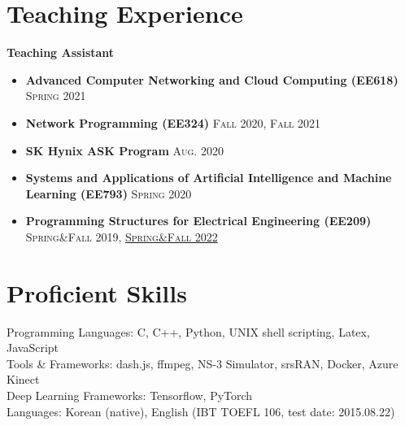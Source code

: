 \documentclass[margin,line,letter]{cv}
\begin{document}
\begin{resume}
\section{\sc Teaching Experience}
\textbf{Teaching Assistant}
\begin{itemize}[leftmargin=.2in] 
	\item{\textbf{Advanced Computer Networking and Cloud Computing (EE618)}
	\hfill \textsc{Spring} 2021}
	\item{\textbf{Network Programming (EE324)}
	\hfill \textsc{Fall} 2020, \textsc{Fall} 2021}
	\item{\textbf{SK Hynix ASK Program}
	\hfill \textsc{Aug.} 2020}
	\item{\textbf{Systems and Applications of Artificial Intelligence and Machine Learning (EE793)}
	\hfill \textsc{Spring} 2020}
	\item{\textbf{Programming Structures for Electrical Engineering (EE209)}
	\hfill \textsc{Spring}\&\textsc{Fall} 2019, \href{https://ee209.kaist.ac.kr/}{\textsc{Spring}\&\textsc{Fall} 2022}}
\end{itemize}
\vspace{0.1cm}
\section{\sc Proficient Skills \\}
Programming Languages: C, C++, Python, UNIX shell scripting, Latex, JavaScript \\
Tools \& Frameworks: dash.js, ffmpeg, NS-3 Simulator, srsRAN, Docker, Azure Kinect \\ 
Deep Learning Frameworks: Tensorflow, PyTorch \\
Languages: Korean (native), English (IBT TOEFL 106, test date: 2015.08.22)

\end{resume}
\end{document}
